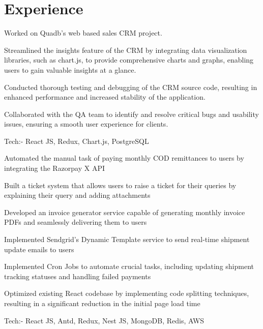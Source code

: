 \documentclass[]{deedy-resume-openfont}
\begin{document}
\hfill
\begin{minipage}[t]{0.66\textwidth} 


\section{Experience}

\vspace{\topsep}
\begin{tightemize}
\item Worked on Quadb's web based sales CRM project.
\item Streamlined the insights feature of the CRM by integrating data visualization libraries, such as chart.js, to provide comprehensive charts and graphs, enabling users to gain valuable insights at a glance.
\item Conducted thorough testing and debugging of the CRM source code, resulting in enhanced performance and increased stability of the application.
\item Collaborated with the QA team to identify and resolve critical bugs and usability issues, ensuring a smooth user experience for clients.
\item Tech:- React JS, Redux, Chart.js, PostgreSQL
\end{tightemize}
\sectionsep

\begin{tightemize}
\item Automated the manual task of paying monthly COD remittances to users by integrating the Razorpay X API
\item Built a ticket system that allows users to raise a ticket for their queries by explaining their query and adding attachments
\item Developed an invoice generator service capable of generating monthly invoice PDFs and seamlessly delivering them to users
\item Implemented Sendgrid's Dynamic Template service to send real-time shipment update emails to users
\item Implemented Cron Jobs to automate crucial tasks, including updating shipment tracking statuses and handling failed payments
\item Optimized existing React codebase by implementing code splitting techniques, resulting in a significant reduction in the initial page load time
\item Tech:- React JS, Antd, Redux, Nest JS, MongoDB, Redis, AWS
\end{tightemize}
\sectionsep


\end{minipage}
\end{document}
